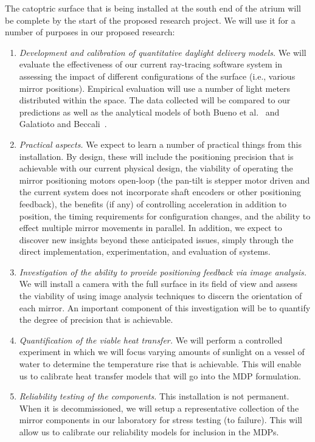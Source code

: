 The catoptric surface that is being installed at the south end of the
atrium will be complete by the start of the proposed research project.
We will use it for a number of purposes in our proposed research:
\begin{enumerate}

\item \emph{Development and calibration of quantitative daylight delivery models.}
We will evaluate the effectiveness of our current ray-tracing software
system in assessing the impact of different configurations of the surface
(i.e., various mirror positions).  Empirical evaluation will use a number
of light meters distributed within the space. The data collected will be
compared to our predictions as well as the analytical models
of both Bueno et al.~\cite{bwkk15} and Galatioto and Beccali~\cite{gb16}.

\item \emph{Practical aspects.}  We expect to learn a number of
  practical things from this installation. By design, these will
  include the positioning precision that is achievable with our
  current physical design, the viability of operating the mirror
  positioning motors open-loop (the pan-tilt is stepper motor driven
  and the current system does not incorporate shaft encoders or other
  positioning feedback), the benefits (if any) of controlling
  acceleration in addition to position, the timing requirements for
  configuration changes, and the ability to effect multiple mirror
  movements in parallel. In addition, we expect to discover new insights
  beyond these anticipated issues, simply through the direct implementation, 
  experimentation, and evaluation of systems.

\item \emph{Investigation of the ability to provide positioning feedback via
image analysis.}  We will install a camera with the full surface in its
field of view and assess the viability of using image analysis techniques
to discern the orientation of each mirror.  An important component of this
investigation will be to quantify the degree of precision that is achievable.

\item \emph{Quantification of the viable heat transfer.}
We will perform a controlled experiment in which we will focus varying
amounts of sunlight on a vessel of water to determine the temperature
rise that is achievable.  This will enable us to calibrate heat transfer
models that will go into the MDP formulation.

\item \emph{Reliability testing of the components.}
This installation is not permanent. When it is decommissioned, we will
setup a representative collection of the mirror components in our laboratory
for stress testing (to failure).  This will allow us to calibrate our
reliability models for inclusion in the MDPs.

\end{enumerate}

